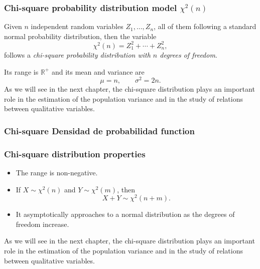 \begin{frame}
\frametitle{Chi-square probability distribution model $\chi^2(n)$}
\begin{definition}
Given $n$ independent random variables $Z_1,\ldots,Z_n$, all of them following a standard normal probability distribution, then the variable
\[
\chi^2(n) = Z_1^2+\cdots +Z_n^2,
\]
follows a \emph{chi-square probability distribution with $n$ degrees of freedom}.
\end{definition}

Its range is $\mathbb{R}^+$ and its mean and variance are
\[
\mu = n, \qquad \sigma^2 = 2n.
\]
As we will see in the next chapter, the chi-square distribution plays an important role in the estimation of the population variance and in the study of relations between qualitative variables.
\end{frame}


\begin{frame}
\frametitle{Chi-square Densidad de probabilidad function}

\begin{center}
\end{center}
\end{frame}


\begin{frame}
\frametitle{Chi-square distribution properties}
\begin{itemize}
\item The range is non-negative.
\item If $X\sim \chi^2(n)$ and $Y\sim \chi^2(m)$, then
\[
X+Y \sim \chi^2(n+m).
\]
\item It asymptotically approaches to a normal distribution as the degrees of freedom increase. 
\end{itemize}
As we will see in the next chapter, the chi-square distribution plays an important role in the estimation of the population variance and in the study of relations between qualitative variables.
\end{frame}



